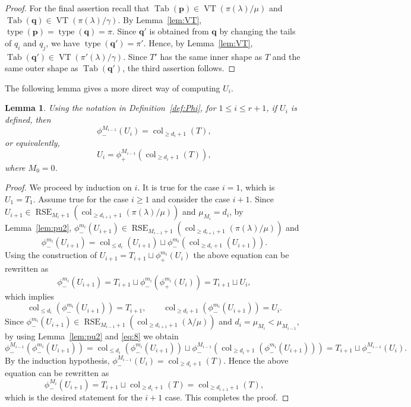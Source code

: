 \documentclass{amsart}
\numberwithin{equation}{section}
\newtheorem{lem}[thm]{Lemma}
\theoremstyle{definition}
\newcommand\type{\operatorname{type}}
\newcommand\VT{\operatorname{VT}}
\newcommand\Tab{\operatorname{Tab}}
\newcommand\col{\operatorname{col}}
\newcommand\pd{\phi_+}
\newcommand\pu{\phi_-}
\newcommand\RSE{\operatorname{RSE}}
\newcommand\pp{\mathbf{p}}
\newcommand\lm{{\lambda/\mu}}
\begin{document}
\begin{proof}
  For the final assertion recall that $\Tab(\pp)\in\VT(\pi(\lambda)/\mu)$ and
  $\Tab(\mathbf{q})\in\VT(\pi(\lambda)/\gamma)$. By Lemma~\ref{lem:VT},
  $\type(\pp)=\type(\mathbf{q})=\pi$. Since $\mathbf{q'}$ is obtained from
  $\mathbf{q}$ by changing the tails of $q_i$ and $q_j$, we have
  $\type(\mathbf{q}')=\pi'$. Hence, by Lemma~\ref{lem:VT},
  $\Tab(\mathbf{q}')\in\VT(\pi'(\lambda)/\gamma)$. Since $T'$ has the same inner
  shape as $T$ and the same outer shape as $\Tab(\mathbf{q}')$, the third
  assertion follows.
\end{proof}


The following lemma gives a more direct way of computing $U_i$.

\begin{lem}\label{lem:U_i}
  Using the notation in Definition~\ref{def:Phi}, for $1\le i\le r+1$, if
  $U_{i}$ is defined, then 
\[
\pu^{M_{i-1}}(U_i)=\col_{\ge d_i+1}(T),
\]
or equivalently,
\[
U_i=\pd^{M_{i-1}}(\col_{\ge d_i+1}(T)),
\]
where $M_0=0$. 
\end{lem}
\begin{proof}
  We proceed by induction on $i$. It is true for the case $i=1$, which is
  $U_1=T_1$. Assume true for the case $i\ge1$ and consider the case $i+1$. Since
  $U_{i+1}\in\RSE_{M_{i}+1}(\col_{\ge d_{i+1}+1}(\pi(\lambda)/\mu))$ and
  $\mu_{M_{i}}=d_{i}$, by Lemma~\ref{lem:pu2},
  $\pu^{m_i}(U_{i+1})\in\RSE_{M_{i-1}+1}(\col_{\ge d_{i+1}+1}(\pi(\lambda)/\mu))$ and
\[
\pu^{m_i}(U_{i+1})=\col_{\le d_i}(U_{i+1})\sqcup \pu^{m_i}(\col_{\ge d_{i}+1}(U_{i+1})).
\]
Using the construction of $U_{i+1}=T_{i+1}\sqcup\pd^{m_i}(U_i)$
the above equation can be rewritten as
\[
  \pu^{m_i}(U_{i+1})=T_{i+1}\sqcup \pu^{m_i}(\pd^{m_i}(U_i))
  =T_{i+1}\sqcup U_i,
\]
which implies
\begin{equation}
  \label{eq:8}
\col_{\le d_i}(\pu^{m_i}(U_{i+1}))=T_{i+1},\qquad  \col_{\ge d_{i}+1}(\pu^{m_i}(U_{i+1}))=U_i.
\end{equation}
Since $\pu^{m_i}(U_{i+1})\in\RSE_{M_{i-1}+1}(\col_{\ge d_{i+1}+1}(\lm))$ and
$d_i=\mu_{M_i}<\mu_{M_{i-1}}$, by using Lemma~\ref{lem:pu2} and \eqref{eq:8}
 we obtain
\[
\pu^{M_{i-1}} (\pu^{m_i}(U_{i+1}))
=\col_{\le d_i}(\pu^{m_i}(U_{i+1}))\sqcup \pu^{M_{i-1}}(\col_{\ge d_{i}+1}(\pu^{m_i}(U_{i+1})))
=T_{i+1}\sqcup \pu^{M_{i-1}}(U_i).
\]
By the induction hypothesis, $\pu^{M_{i-1}}(U_i)= \col_{\ge d_{i}+1}(T)$.
Hence the above equation can be rewritten as
\[
\pu^{M_{i}} (U_{i+1})=T_{i+1}\sqcup \col_{\ge d_{i}+1}(T)= \col_{\ge d_{i+1}+1}(T),
\]
which is the desired statement for the $i+1$ case. This completes the proof.
\end{proof}
\end{document}
